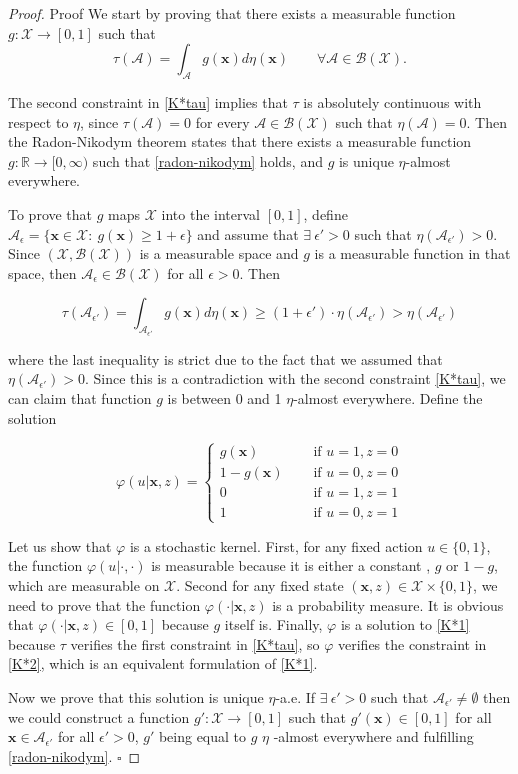 \documentclass[10pt,a4paper]{amsart}
\newcommand{\bx}{\mathbf{x}}
\newcommand{\mA}{\mathcal{A}}
\newcommand{\mABX}{\mathcal{A} \in \mathcal{B}(\mathcal{X})}
\newcommand{\mBX}{ \mathcal{B}(\mathcal{X})}
\newcommand{\mX}{\mathcal{X}}
\begin{document}
	\begin{proof}{Proof}
		We start by proving that there exists a measurable function $g: \mathcal{X} \rightarrow [0,1]$ such that
		\begin{equation} \label{radon-nikodym}
			\tau(\mA)=\int_{\mA} g(\bx) d\eta(\bx) \qquad \forall \mABX.
		\end{equation}
		
		The second constraint in \eqref{K*tau} implies that $\tau$ is absolutely continuous with respect to $\eta$, since $\tau(\mA)=0$ for every $\mABX$ such that $\eta(\mA)=0$. Then the Radon-Nikodym theorem states that there exists a measurable function $g: \mathbb{R} \rightarrow [0,\infty)$ such that \eqref{radon-nikodym} holds, and $g$ is unique $\eta$-almost everywhere. 
		
		
		To prove that $g$ maps $\mX$ into the interval $[0,1]$, define $\mA_\epsilon=\{ \bx \in \mX: \ g(\bx)\geq 1+\epsilon \}$ and assume that $\exists \ \epsilon'>0$ such that $\eta(\mA_{\epsilon'})>0$. Since $(\mX,\mBX)$ is a measurable space and $g$ is a measurable function in that space, then $\mA_\epsilon \in \mBX$ for all $\epsilon>0$. Then
		
		$$\tau(\mA_{\epsilon'})=\int_{\mA_{\epsilon'}} g(\bx) d\eta(\bx) \geq (1+ \epsilon') \cdot \eta(\mA_{\epsilon'}) > \eta(\mA_{\epsilon'}) $$
		
		\noindent where the last inequality is strict due to the fact that we assumed that $\eta(\mA_{\epsilon'})>0$. Since this is a contradiction with the second constraint \eqref{K*tau}, we can claim that function $g$ is between 0 and 1 $\eta$-almost everywhere. Define the solution 
		
		$$
		\varphi(u|\bx,z)=\left\{ 
		\begin{array}{ll}
			g(\bx) & \quad \mbox{ if } u=1,z=0\\
			1-g(\bx) & \quad \mbox{ if } u=0,z=0\\
			0 & \quad \mbox{ if } u=1,z=1\\
			1 & \quad \mbox{ if } u=0,z=1
		\end{array}
		\right.
		$$
		
		
		Let us show that $\varphi$ is a stochastic kernel. First,  for any fixed action $u \in \{0,1\}$, the function $\varphi(u|\cdot,\cdot)$ is measurable because it is either a constant , $g$ or $1-g$, which are measurable on $\mX$. Second for any fixed state $(\bx,z) \in \mX \times \{0,1\}$, we need to prove that the function $\varphi(\cdot|\bx,z)$ is a probability measure. It is obvious that $\varphi(\cdot|\bx,z) \in [0,1]$ because $g$ itself is. Finally, $\varphi$ is a solution to \eqref{K*1} because $\tau$ verifies the first constraint in \eqref{K*tau}, so $\varphi$ verifies the constraint in \eqref{K*2}, which is an equivalent formulation of \eqref{K*1}.
		
		
		Now we prove that this solution is unique $\eta$-a.e. If $\exists \ \epsilon'>0$ such that $\mA_{\epsilon'} \neq \emptyset$ then we could construct a function $g': \mX \rightarrow [0,1]$ such that $g'(\bx)\in [0,1]$ for all $\bx \in \mA_{\epsilon'}$ for all $\epsilon' >0$, $g'$ being equal to $g$ $\eta$ -almost everywhere and fulfilling \eqref{radon-nikodym}. \hfill $\square$
	\end{proof}
\end{document}
